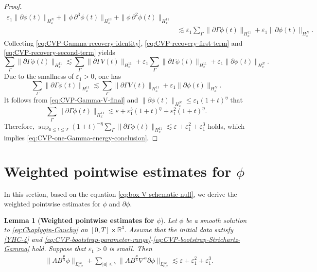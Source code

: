 \documentclass[11pt,twoside]{article}
\def\ds{\displaystyle}
\def\p{\partial}
\def\ve{\varepsilon}
\def\ls{\lesssim}
\theoremstyle{plain}
\newtheorem{lemma}[theorem]{Lemma}
\theoremstyle{definition}
\theoremstyle{assumption}
\numberwithin{equation}{section}
\begin{document}
\begin{proof}
\begin{equation}
\begin{aligned}
				\ve_1
				\|\p\phi(t)\|_{H^N_x}
				+
				\|\phi\,\p^3\phi(t)\|_{H^{10}_x}
				+
				\|\phi\,\p^2\phi(t)\|_{H^{11}_x}
				\\
				&\ls
				\ve_1
				\sum_{\Gamma}
				\|\p\Gamma\phi(t)\|_{H^{11}_x}
				+
				\ve_1
				\|\p\phi(t)\|_{H^N_x}.
			\end{aligned}
		\end{equation}
		Collecting
		\eqref{eq:CVP-Gamma-recovery-identity},
		\eqref{eq:CVP-recovery-first-term} and
		\eqref{eq:CVP-recovery-second-term} yields
		\[
		\sum_{\Gamma}
		\|\p\Gamma\phi(t)\|_{H^{11}_x}
		\ls
		\sum_{\Gamma}
		\|\p\Gamma V(t)\|_{H^{11}_x}
		+
		\ve_1
		\sum_{\Gamma}
		\|\p\Gamma\phi(t)\|_{H^{11}_x}
		+
		\ve_1
		\|\p\phi(t)\|_{H^N_x}.
		\]
		Due to the smallness of \(\ve_1>0\), one has
		\begin{equation}
			\label{eq:CVP-Gamma-phi-recovery-final}
			\sum_{\Gamma}
			\|\p\Gamma\phi(t)\|_{H^{11}_x}
			\ls
			\sum_{\Gamma}
			\|\p\Gamma V(t)\|_{H^{11}_x}
			+
			\ve_1
			\|\p\phi(t)\|_{H^N_x}.
		\end{equation}
		It follows from
		\eqref{eq:CVP-Gamma-V-final} and
		$\|\p\phi(t)\|_{H^N_x}\le\ve_1(1+t)^\eta$
		that
		\[
		\sum_{\Gamma}
		\|\p\Gamma\phi(t)\|_{H^{11}_x}
		\ls
		\ve
		+
		\ve_1^3(1+t)^\eta
		+
		\ve_1^2(1+t)^\eta.
		\]
		Therefore, $\ds\sup_{0\le t\le T}
		(1+t)^{-\eta}
		\ds\sum_{\Gamma}
		\|\p\Gamma\phi(t)\|_{H^{11}_x}
		\ls
		\ve+\ve_1^2+\ve_1^3$ holds,
		which implies \eqref{eq:CVP-one-Gamma-energy-conclusion}.
	\end{proof}
	
	
	
	
	
	
	\section{Weighted pointwise estimates for $\phi$}
	\label{sec:weighted-pointwise-estimates-I}
	
	In this section, based on the equation \eqref{eq:box-V-schematic-null}, we derive the weighted pointwise estimates for $\phi$ and
	$\p\phi$.
	

	
	\begin{lemma}[{\bf Weighted pointwise estimates for $\phi$}]
		\label{lem:CVP-weighted-pointwise-estimate-new}
		Let \(\phi\) be a smooth solution to
		\eqref{eq:Chaplygin-Cauchy} on \([0,T]\times\mathbb R^3\).
		Assume that the initial data satisfy \eqref{YHC-4} and
		\eqref{eq:CVP-bootstrap-parameter-range}-\eqref{eq:CVP-bootstrap-Strichartz-Gamma}
		hold. Suppose that \(\ve_1>0\) is small. Then
		\begin{equation}
			\label{eq:CVP-weighted-conclusion-new}
			\begin{aligned}
				&
				\big\|
				AB^{\frac{\mu}{4}}\phi
				\big\|_{L^\infty_{t,x}}
				+
				\sum_{|a|\le 7}
				\big\|
				AB^{\frac{\mu}{4}}
				\nabla^a\p\phi
				\big\|_{L^\infty_{t,x}}
				\ls
				\ve+\ve_1^2+\ve_1^3.
			\end{aligned}
		\end{equation}
	\end{lemma}
	
\end{document}
